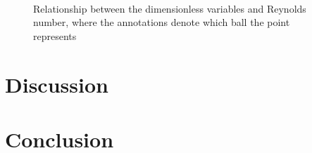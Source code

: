 \documentclass[11pt,a4paper]{article}
\begin{document}
    \begin{figure}[H]
    \center
    \\
    \caption{Relationship between the dimensionless variables and Reynolds number, where the annotations denote which ball the point represents}
    \label{fig:plots2}
  \end{figure}




\section{\label{sect:discuss}Discussion}
\section{\label{sect:conclusion}Conclusion}





%
%
\end{document}
